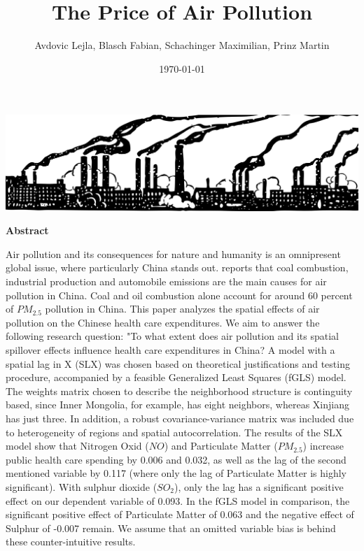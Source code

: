 \documentclass[
]{article}
\title{The Price of Air Pollution}
\author{Avdovic Lejla, Blasch Fabian, Schachinger Maximilian, Prinz Martin}
\date{\today}
\begin{document}
	\maketitle
	
	\begin{center}
		\includegraphics[width = 380pt]{pollution.png} 
	\end{center}
	\thispagestyle{empty}
	\vspace*{12pt}
	\begin{center}
		\textbf{Abstract} 
	\end{center}
	Air pollution and its consequences for nature and humanity is an omnipresent global issue, where particularly China stands out. \cite{rasch_under_nodate} reports that coal combustion, industrial production
	and automobile emissions are the main causes for
	air pollution in China. Coal and oil combustion alone account for around 60 percent of $PM_2.5$ pollution in China.
	This paper analyzes the spatial effects of air pollution on the Chinese health care expenditures. We aim to answer the following research question: "To what extent does air pollution and its spatial spillover effects influence health care expenditures in China? A model with a spatial lag in X (SLX) was chosen based on theoretical justifications and testing procedure, accompanied by a feasible Generalized Least Squares (fGLS) model. 
	The weights matrix chosen to describe the neighborhood structure is continguity based, since Inner Mongolia, for example, has eight neighbors, whereas Xinjiang has just three. 
	In addition, a robust covariance-variance matrix was included due to heterogeneity of regions and spatial autocorrelation. The results of the SLX model show that Nitrogen Oxid ($NO$) and Particulate Matter ($PM_{2.5}$)
	increase public health care spending by 0.006 and 0.032, as well as the lag of the second mentioned variable by 0.117 (where only the lag of Particulate Matter is highly significant). With sulphur dioxide ($SO_2$), only the lag has a significant positive effect on our dependent variable of 0.093. In the fGLS model in comparison, the significant positive effect of Particulate Matter of 0.063 and the negative effect of Sulphur of -0.007 remain. We assume that an omitted variable bias is behind these counter-intuitive results.
\end{document}
